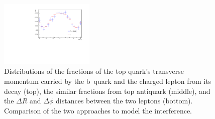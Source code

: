 \begin{figure}
  \includegraphics[width=0.4\textwidth]{fig/chapt4/gen_plots/ll_deltaphi_compare.pdf}
  \caption{Distributions of the fractions of the top quark's transverse momentum carried by the b~quark and the charged lepton from its decay (top), the similar fractions from top antiquark (middle), and the $\Delta R$ and $\Delta\phi$ distances between the two leptons (bottom). Comparison of the two approaches to model the interference.}
  \label{fig:comparison_bandl_relto_top}
\end{figure}

